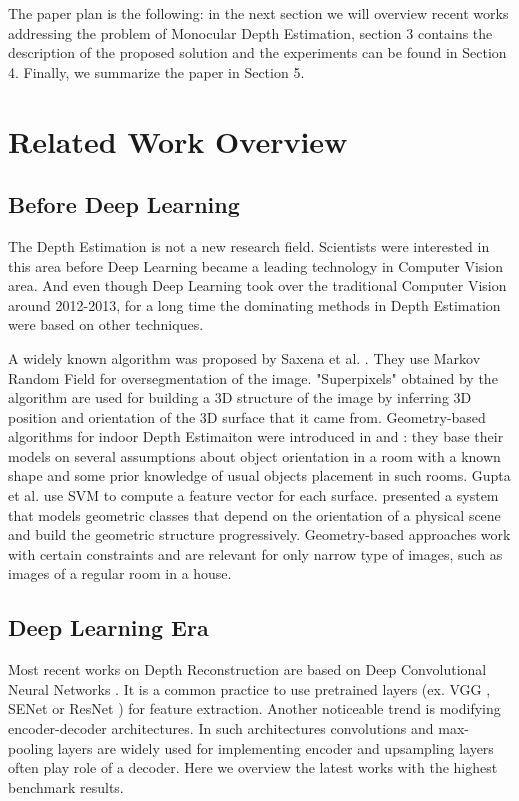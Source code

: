 \documentclass[10pt,twocolumn,letterpaper]{article}
\begin{document}
The paper plan is the following: in the next section we will overview recent works addressing the problem of Monocular Depth Estimation, section 3 contains the description of the proposed solution and the experiments can be found in Section 4. Finally, we summarize the paper in Section 5.


\section{Related Work Overview}

\subsection{Before Deep Learning}

The Depth Estimation is not a new research field. Scientists were interested
in this area before Deep Learning became a leading technology in Computer Vision
area. And even though Deep Learning took over the traditional Computer Vision
around 2012-2013, for a long time the dominating methods in Depth Estimation were based
on other techniques.

A widely known algorithm was proposed by Saxena et al. \cite{saxena2009make3d}. They use Markov Random Field for oversegmentation of the image. "Superpixels" obtained by the algorithm are used for building a 3D structure of the image by inferring 3D  position and orientation of the 3D surface that it came from. Geometry-based algorithms for indoor Depth Estimaiton were introduced in \cite{hedau2010thinking} and \cite{gupta2010estimating}: they base their models on several assumptions about object orientation in a room with a known shape and some prior knowledge of usual objects placement in such rooms. Gupta et al. use SVM to compute a feature vector for each surface.  \cite{hoiem2005geometric} presented a system that models geometric classes that depend on the orientation of a physical scene and build the geometric structure progressively. Geometry-based approaches work with certain constraints and are relevant for only narrow type of images, such as images of a regular room in a house.



\subsection{Deep Learning Era}

Most recent works on Depth Reconstruction are based on Deep Convolutional Neural Networks \cite{eigen2015predicting, krizhevsky2012imagenet, kuznietsov2017semi, laina2016deeper, liu2016learning}. It is a common practice to use pretrained layers (ex. VGG \cite{simonyan2014very}, SENet \cite{hu2017squeeze} or ResNet \cite{he2016deep}) for feature extraction. Another noticeable trend is modifying encoder-decoder architectures. In such architectures convolutions and max-pooling layers are widely used for implementing encoder and upsampling layers often play role of a decoder.
Here we overview the latest works with the highest benchmark results.
\end{document}
